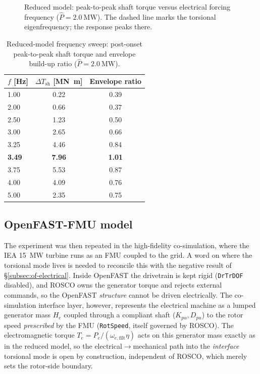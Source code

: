 \begin{figure}[t]
  \centering
  \caption{Reduced model: peak-to-peak shaft torque versus electrical forcing
  frequency ($\hat{P}=\SI{2.0}{\mega\watt}$). The dashed line marks the
  torsional eigenfrequency; the response peaks there.}
  \label{fig:fr-curve-simple}
\end{figure}

\begin{table}[t]
  \centering
  \caption{Reduced-model frequency sweep: post-onset peak-to-peak shaft torque
  and envelope build-up ratio ($\hat{P}=\SI{2.0}{\mega\watt}$).}
  \label{tab:fr-sweep}
  \begin{tabular}{lcc}
    \toprule
    $f$ [\si{\hertz}] & $\Delta T_{\mathrm{sh}}$ [\si{\mega\newton\metre}] &
      Envelope ratio \\
    \midrule
    1.00 & 0.22 & 0.39 \\
    2.00 & 0.66 & 0.37 \\
    2.50 & 1.23 & 0.50 \\
    3.00 & 2.65 & 0.66 \\
    3.25 & 4.46 & 0.84 \\
    \textbf{3.49} & \textbf{7.96} & \textbf{1.01} \\
    3.75 & 5.53 & 0.87 \\
    4.00 & 4.09 & 0.76 \\
    5.00 & 2.35 & 0.75 \\
    \bottomrule
  \end{tabular}
\end{table}

\subsection{OpenFAST-FMU model}
\label{subsec:fr-fmu}

The experiment was then repeated in the high-fidelity co-simulation, where the
IEA \SI{15}{\mega\watt} turbine runs as an FMU coupled to the grid. A word on
where the torsional mode lives is needed to reconcile this with the negative
result of \S\ref{subsec:of-electrical}. Inside OpenFAST the drivetrain is kept
rigid (\texttt{DrTrDOF} disabled), and ROSCO owns the generator torque and
rejects external commands, so the OpenFAST \emph{structure} cannot be driven
electrically. The co-simulation interface layer, however, represents the
electrical machine as a lumped generator mass $H_e$ coupled through a compliant
shaft ($K_{pu},D_{pu}$) to the rotor speed \emph{prescribed} by the FMU
(\texttt{RotSpeed}, itself governed by ROSCO). The electromagnetic torque
$T_e = P_e/(\omega_{e,\mathrm{filt}}\eta)$ acts on this generator mass exactly
as in the reduced model, so the electrical$\to$mechanical path into the
\emph{interface} torsional mode is open by construction, independent of ROSCO,
which merely sets the rotor-side boundary.

